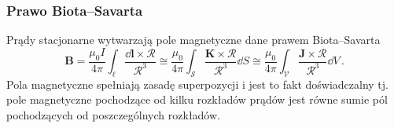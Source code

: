 \documentclass[../main.tex]{subfiles}
\begin{document}
\subsubsection{Prawo Biota--Savarta}
Prądy stacjonarne wytwarzają pole magnetyczne dane prawem Biota--Savarta
\begin{equation*}
    \mathbf{B}=\frac{\mu_0I}{4\pi}\int_\ell\frac{\dd{\mathbf{l}}\times\boldsymbol{\mathcal{R}}}{\mathcal{R}^3}\cong\frac{\mu_0}{4\pi}\int_\mathcal{S}\frac{\mathbf{K}\times\boldsymbol{\mathcal{R}}}{\mathcal{R}^3}\dd{S}\cong\frac{\mu_0}{4\pi}\int_\mathcal{V}\frac{\mathbf{J}\times\boldsymbol{\mathcal{R}}}{\mathcal{R}^3}\dd{V}\,.
\end{equation*}
Pola magnetyczne spełniają zasadę superpozycji i jest to fakt doświadczalny tj. pole magnetyczne
pochodzące od kilku rozkładów prądów jest równe sumie pól pochodzących od poszczególnych
rozkładów.\\

\noindent{}\\
\end{document}
